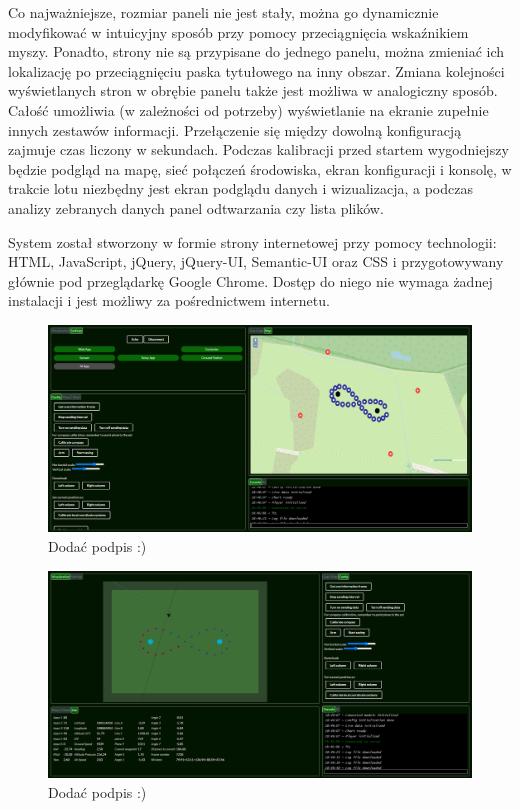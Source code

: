 \documentclass[12pt, a4paper]{article}
\begin{document}
Co najważniejsze, rozmiar paneli nie jest stały, można go dynamicznie modyfikować w intuicyjny sposób przy pomocy przeciągnięcia wskaźnikiem myszy. Ponadto, strony nie są przypisane do jednego panelu, można zmieniać ich lokalizację po przeciągnięciu paska tytułowego na inny obszar. Zmiana kolejności wyświetlanych stron w obrębie panelu także jest możliwa w analogiczny sposób. Całość umożliwia (w zależności od potrzeby) wyświetlanie na ekranie zupełnie innych zestawów informacji. Przełączenie się między dowolną konfiguracją zajmuje czas liczony w sekundach. Podczas kalibracji przed startem wygodniejszy będzie podgląd na mapę, sieć połączeń środowiska, ekran konfiguracji i konsolę, w trakcie lotu niezbędny jest ekran podglądu danych i wizualizacja, a podczas analizy zebranych danych panel odtwarzania czy lista plików.



System został stworzony w formie strony internetowej przy pomocy technologii: HTML, JavaScript, jQuery, jQuery-UI, Semantic-UI oraz CSS i przygotowywany głównie pod przeglądarkę Google Chrome. Dostęp do niego nie wymaga żadnej instalacji i jest możliwy za pośrednictwem internetu. 


 \begin{figure}[ht]
    \centering
    \includegraphics[width=1\textwidth]{przedlotem}
    \caption{Dodać podpis :)}
\end{figure}

 \begin{figure}[ht]
    \centering
    \includegraphics[width=1\textwidth]{podczaslotu}
    \caption{Dodać podpis :)}
\end{figure}
\end{document}
